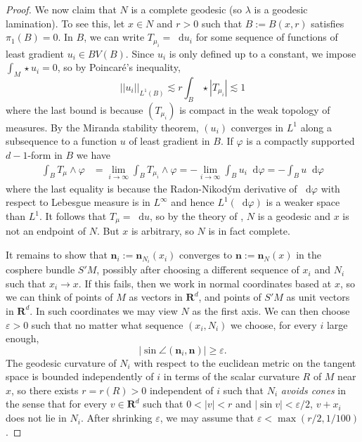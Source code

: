 \documentclass[reqno,10pt]{amsart}
\newcommand{\RR}{\mathbf{R}}
\newcommand*\dif{\mathop{}\!\mathrm{d}}
\newcommand{\normal}{\mathbf n}
\newcommand{\dfn}[1]{\emph{#1}\index{#1}}
\theoremstyle{definition}
\numberwithin{equation}{section}
\begin{document}
\begin{proof}
We now claim that $N$ is a complete geodesic (so $\lambda$ is a geodesic lamination).
To see this, let $x \in N$ and $r > 0$ such that $B := B(x, r)$ satisfies $\pi_1(B) = 0$.
In $B$, we can write $T_{\mu_i} = \dif u_i$ for some sequence of functions of least gradient $u_i \in BV(B)$.
Since $u_i$ is only defined up to a constant, we impose $\int_M \star u_i = 0$, so by Poincar\'e's inequality,
$$||u_i||_{L^1(B)} \lesssim r\int_B \star |T_{\mu_i}| \lesssim 1$$
where the last bound is because $(T_{\mu_i})$ is compact in the weak topology of measures.
By the Miranda stability theorem, $(u_i)$ converges in $L^1$ along a subsequence to a function $u$ of least gradient in $B$.
If $\varphi$ is a compactly supported $d-1$-form in $B$ we have 
\begin{align*}
\int_B T_\mu \wedge \varphi
&= \lim_{i \to \infty} \int_B T_{\mu_i} \wedge \varphi 
= -\lim_{i \to \infty} \int_B u_i \dif \varphi = - \int_B u \dif \varphi
\end{align*}
where the last equality is because the Radon-Nikod\'ym derivative of $\dif \varphi$ with respect to Lebesgue measure is in $L^\infty$ and hence $L^1(\dif \varphi)$ is a weaker space than $L^1$.
It follows that $T_\mu = \dif u$, so by the theory of \cite{BackusFLG}, $N$ is a geodesic and $x$ is not an endpoint of $N$.
But $x$ is arbitrary, so $N$ is in fact complete.

It remains to show that $\normal_i := \normal_{N_i}(x_i)$ converges to $\normal := \normal_N(x)$ in the cosphere bundle $S'M$, possibly after choosing a different sequence of $x_i$ and $N_i$ such that $x_i \to x$.
If this fails, then we work in normal coordinates based at $x$, so we can think of points of $M$ as vectors in $\RR^d$, and points of $S'M$ as unit vectors in $\RR^d$.
In such coordinates we may view $N$ as the first axis.
We can then choose $\varepsilon > 0$ such that no matter what sequence $(x_i, N_i)$ we choose, for every $i$ large enough,
$$|\sin \angle(\normal_i, \normal)| \geq \varepsilon.$$
The geodesic curvature of $N_i$ with respect to the euclidean metric on the tangent space is bounded independently of $i$ in terms of the scalar curvature $R$ of $M$ near $x$, so there exists $r = r(R) > 0$ independent of $i$ such that $N_i$ \dfn{avoids cones} in the sense that for every $v \in \RR^d$ such that $0 < |v| < r$ and $|\sin v| < \varepsilon/2$, $v + x_i$ does not lie in $N_i$.
After shrinking $\varepsilon$, we may assume that $\varepsilon < \max(r/2, 1/100)$.


\end{proof}
\end{document}
